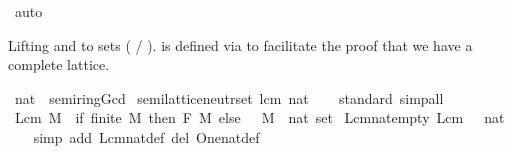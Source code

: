 \begin{isabellebody}
\ auto%
\endisatagproof
{\isafoldproof}%
%
\isadelimproof
%
\endisadelimproof
%
\isadelimdocument
%
\endisadelimdocument
%
\isatagdocument
%
\isamarkuptrue%
%
\endisatagdocument
{\isafolddocument}%
%
\isadelimdocument
%
\endisadelimdocument
%
\begin{isamarkuptext}%
Lifting  and  to sets ( / ).
   is defined via  to facilitate the proof that we have a complete lattice.%
\end{isamarkuptext}\isamarkuptrue%
\isamarkupfalse%
\ nat\ {\isacharcolon}{\kern0pt}{\isacharcolon}{\kern0pt}\ semiring{\isacharunderscore}{\kern0pt}Gcd\isanewline
{}\isanewline
\isanewline
{}\isamarkupfalse%
\ semilattice{\isacharunderscore}{\kern0pt}neutr{\isacharunderscore}{\kern0pt}set\ lcm\ {\isachardoublequoteopen}{}{\isacharcolon}{\kern0pt}{\isacharcolon}{\kern0pt}nat{\isachardoublequoteclose}\isanewline
%
\isadelimproof
\ \ %
\endisadelimproof
%
\isatagproof
{}\isamarkupfalse%
\ standard\ simp{\isacharunderscore}{\kern0pt}all%
\endisatagproof
{\isafoldproof}%
%
\isadelimproof
\isanewline
%
\endisadelimproof
\isanewline
{}\isamarkupfalse%
\ {\isachardoublequoteopen}Lcm\ M\ {\isacharequal}{\kern0pt}\ {\isacharparenleft}{\kern0pt}if\ finite\ M\ then\ F\ M\ else\ {}{\isacharparenright}{\kern0pt}{\isachardoublequoteclose}\ \ M\ {\isacharcolon}{\kern0pt}{\isacharcolon}{\kern0pt}\ {\isachardoublequoteopen}nat\ set{\isachardoublequoteclose}\isanewline
\isanewline
{}\isamarkupfalse%
\ Lcm{\isacharunderscore}{\kern0pt}nat{\isacharunderscore}{\kern0pt}empty{\isacharcolon}{\kern0pt}\ {\isachardoublequoteopen}Lcm\ {\isacharbraceleft}{\kern0pt}{\isacharbraceright}{\kern0pt}\ {\isacharequal}{\kern0pt}\ {\isacharparenleft}{\kern0pt}{}{\isacharcolon}{\kern0pt}{\isacharcolon}{\kern0pt}nat{\isacharparenright}{\kern0pt}{\isachardoublequoteclose}\isanewline
%
\isadelimproof
\ \ %
\endisadelimproof
%
\isatagproof
{}\isamarkupfalse%
\ {\isacharparenleft}{\kern0pt}simp\ add{\isacharcolon}{\kern0pt}\ Lcm{\isacharunderscore}{\kern0pt}nat{\isacharunderscore}{\kern0pt}def\ del{\isacharcolon}{\kern0pt}\ One{\isacharunderscore}{\kern0pt}nat{\isacharunderscore}{\kern0pt}def{\isacharparenright}{\kern0pt}%
\endisatagproof
{\isafoldproof}%
%
\isadelimproof
\isanewline
%
\endisadelimproof
\isanewline
{}\isamarkupfalse%

\end{isabellebody}
